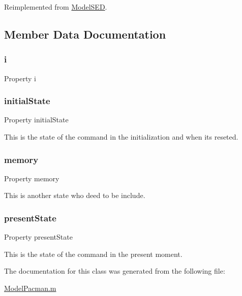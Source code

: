 Reimplemented from \hyperlink{class_model_s_e_d_adb8aaccb857cf5bbec640cd00915459d}{Model\+S\+ED}.



\subsection{Member Data Documentation}
\mbox{\label{class_model_pacman_a103c618d75e54c3a72fac6bcaa59f61f}} 
\subsubsection{\texorpdfstring{i}{i}}
{\footnotesize\ttfamily Property i}

\mbox{\label{class_model_pacman_acd9263acfa96c9138afdf497e55acc24}} 
\subsubsection{\texorpdfstring{initial\+State}{initialState}}
{\footnotesize\ttfamily Property initial\+State}



This is the state of the command in the initialization and when it\textquotesingle{}s reseted. 

\mbox{\label{class_model_pacman_a9a61c54203464d470acd8580a6464f8e}} 
\subsubsection{\texorpdfstring{memory}{memory}}
{\footnotesize\ttfamily Property memory}



This is another state who deed to be include. 

\mbox{\label{class_model_pacman_a9624cc7c421a50fa5086b0ebd0cd5fe3}} 
\subsubsection{\texorpdfstring{present\+State}{presentState}}
{\footnotesize\ttfamily Property present\+State}



This is the state of the command in the present moment. 



The documentation for this class was generated from the following file\+:\begin{DoxyCompactItemize}
\item 
\hyperlink{_model_pacman_8m}{Model\+Pacman.\+m}\end{DoxyCompactItemize}
